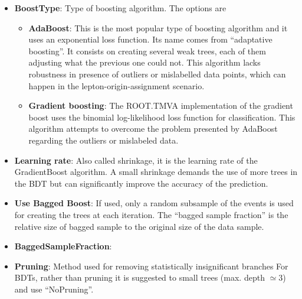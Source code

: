 \begin{itemize}
	\item \textbf{BoostType}: Type of boosting algorithm. The options are
		\begin{itemize}
			\item \textbf{AdaBoost}: This is the most popular type of boosting algorithm and it
				uses an exponential loss function. Its name comes from ``adaptative boosting''.
				It consists on creating several weak trees, each of them adjusting what the previous one
				could not. This algorithm lacks robustness in presence of outliers or mislabelled data points,
				which can happen in the lepton-origin-assignment scenario.
			\item \textbf{Gradient boosting}: The ROOT.TMVA implementation of the gradient boost
				 uses the binomial log-likelihood loss function for classification. This algorithm attempts
				 to overcome the problem presented by AdaBoost regarding the outliers or mislabeled data.
		\end{itemize}
		
	\item \textbf{Learning rate}: Also called shrinkage, it is the learning rate of the GradientBoost 
		algorithm. A small shrinkage demands the use of more trees in the BDT but 
 		can significantly improve the accuracy of the prediction.
		
		
		
	\item \textbf{Use Bagged Boost}: If used, only a random subsample of the events 
		is used for creating the trees at each iteration. The ``bagged sample fraction''
		is the relative size of bagged sample to the original size of the data sample.
	
		
	 \item \textbf{BaggedSampleFraction}:
	
	\item \textbf{Pruning}: Method used for removing statistically insignificant
		branches For BDTs, rather than pruning it is suggested to 
		small trees (max. depth $\simeq 3$) and use ``NoPruning''.
\end{itemize}


